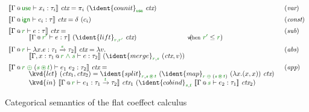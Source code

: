 \newcommand{\ctx}{\textit{ctx}}
\begin{figure*}[t]

\begin{equation*}
\begin{array}{ll}
\sem{\coctx{\Gamma}{\cunit} \vdash x_i : \tau_i }~\ctx =
  \pi_i~(\ident{counit}_{\cunit}~\ctx) & (\emph{var})
\\[0.5em]
\sem{\coctx{\Gamma}{\czero} \vdash c_i : \tau }~\ctx =
  \delta~(c_i) & (\emph{const})
\\[0.5em]
\sem{\coctx{\Gamma}{\cclrd{r}} \vdash e : \tau }~\ctx = & (\emph{sub})\\[-0.25em]
  \hspace{3em}\sem{\coctx{\Gamma}{\cclrd{r'}} \vdash e : \tau }~(\ident{lift}_{\cclrd{r}, \cclrd{r'}}~\ctx)~
    \hspace{7.5em}(\hspace{-0.7em}\textnormal{\footnotesize when}~\cclrd{r'} \leq \cclrd{r})
\\[0.5em]
\sem{\coctx{\Gamma}{\cclrd{r}} \vdash \lambda x.e : \tau_1 \xrightarrow{\cclrd{s}} \tau_2 }~\ctx = \lambda v.& (\emph{abs})\\[-0.25em]
  \hspace{3em}\sem{\coctx{\Gamma, x:\tau_1}{\cclrd{r}\;\czip\;\cclrd{s}} \vdash e : \tau_2}~(\ident{merge}_{\cclrd{r}, \cclrd{s}}~(\ctx, v))
\\[0.5em]
\sem{\coctx{\Gamma}{\cclrd{r} \;\cpar\; (\cclrd{s} \,\cseq\, \cclrd{t})} \vdash e_1~e_2 : \tau_2}~\ctx = & (\emph{app})\\[-0.25em]
  \hspace{2.5em}
  \begin{array}{l}  
  \kvd{let}~(\ctx_1, \ctx_2) = \ident{split}_{\cclrd{r}, \cclrd{s} \,\cseq\, \cclrd{t}}~
    (\ident{map}_{\cclrd{r} \;\cpar\; (\cclrd{s} \,\cseq\, \cclrd{t})}~(\lambda x.(x,x))~\ctx) \\[-0.25em]
  \kvd{in}~\sem{\coctx{\Gamma}{\cclrd{r}} \vdash e_1 : \tau_1 \xrightarrow{\cclrd{t}} \tau_2}~\ctx_1~
      (\ident{cobind}_{\cclrd{s}, \cclrd{t}}~\sem{\coctx{\Gamma}{\cclrd{s}} \vdash e_2 : \tau_1 }~\ctx_2)
  \end{array}    
\end{array}
\end{equation*}

\caption{Categorical semantics of the flat coeffect calculus}
\label{fig:flat-semantics}
\end{figure*}



